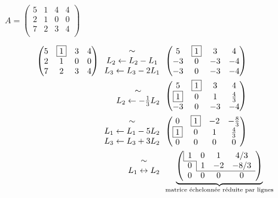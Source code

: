 \begin{exm}
	$A = \begin{pmatrix}
		5&1&4&4\\
		2&1&0&0\\
		7&2&3&4\\
	\end{pmatrix}$

	\begin{align*}
		\begin{pmatrix}
			5 & \bx 1 & 3 & 4\\
			2 & 1 & 0 & 0\\
			7 & 2 & 3 & 4
		\end{pmatrix}
		\begin{array}{c}
			\sim \\
			L_2 \leftarrow L_2 - L_1\\
			L_3 \leftarrow L_3 - 2L_1
		\end{array}&
		\begin{pmatrix}
			5&\bx 1 & 3 & 4\\
			-3 & 0 & -3 & -4\\
			-3 & 0 & -3 & -4\\
		\end{pmatrix}\\
		\begin{array}{c}
			\sim\\
			L_2 \leftarrow -\frac{1}{3} L_2
		\end{array}&
		\begin{pmatrix}
			5&\bx 1&3&4\\
			\bx 1&0&1&\frac{4}{3}\\
			-3&0&-3&-4
		\end{pmatrix}\\
		\begin{array}{c}
			\sim\\
			L_1 \leftarrow L_1 - 5L_2\\
			L_3 \leftarrow L_3 + 3L_2
		\end{array} &
		\begin{pmatrix}
			0 & \bx 1 & -2 & -\frac{8}{3}\\
			\bx 1 & 0 & 1 & \frac{4}{3}\\
			0&0&0&0
		\end{pmatrix}\\
		\begin{array}{c}
			\sim\\
			L_1 \leftrightarrow L_2
		\end{array}&
		\underbrace{
			\left(\begin{array}{c c c c c}
				\multicolumn{1}{|c}1 & 0 & 1 & {4}/{3}\\ \cline{1-1}
				0 & \multicolumn{1}{|c}1 & -2 & -{8}/{3}\\ \cline{2-4}
				0&0&0&0\\
			\end{array}\right)
		}_{\text{matrice échelonnée réduite par lignes}}
	\end{align*}
\end{exm}


